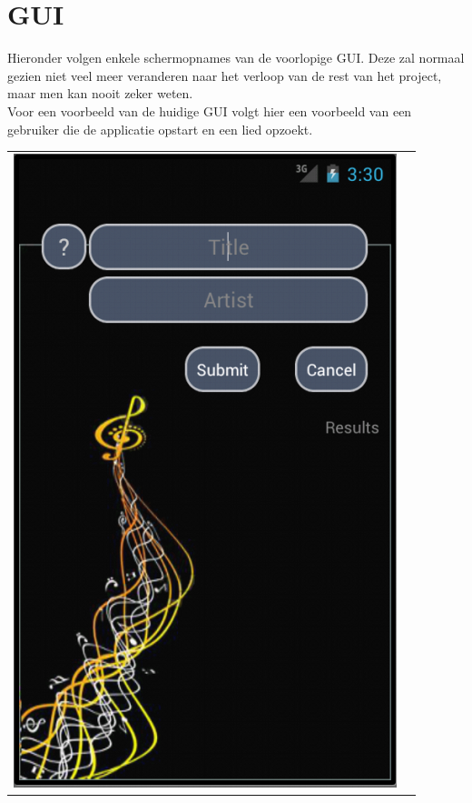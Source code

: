 \documentclass[11pt,a4paper]{article}
\begin{document}
	
	
\newpage %
\section{GUI}
	Hieronder volgen enkele schermopnames van de voorlopige GUI. Deze zal normaal gezien niet veel meer veranderen naar het verloop van de rest van het project, maar men kan nooit zeker weten.\\
	Voor een voorbeeld van de huidige GUI volgt hier een voorbeeld van een gebruiker die de applicatie opstart en een lied opzoekt.  \\ \newline
	
	\begin{tabular}{l l}
		\begin{minipage}{5cm}
			\includegraphics[scale=0.4]{GUI_0124_startscreen.png}

\end{minipage}
\end{tabular}
\end{document}
